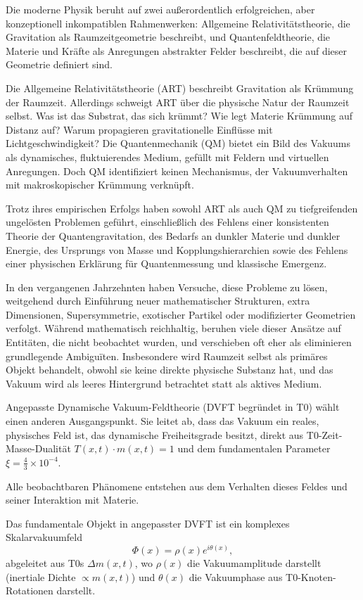 	Die moderne Physik beruht auf zwei außerordentlich erfolgreichen, aber konzeptionell inkompatiblen Rahmenwerken:
	Allgemeine Relativitätstheorie, die Gravitation als Raumzeitgeometrie beschreibt, und Quantenfeldtheorie, die Materie und Kräfte als Anregungen abstrakter Felder beschreibt, die auf dieser Geometrie definiert sind.
	
	Die Allgemeine Relativitätstheorie (ART) beschreibt Gravitation als Krümmung der Raumzeit.
	Allerdings schweigt ART über die physische Natur der Raumzeit selbst.
	Was ist das Substrat, das sich krümmt?
	Wie legt Materie Krümmung auf Distanz auf?
	Warum propagieren gravitationelle Einflüsse mit Lichtgeschwindigkeit?
	Die Quantenmechanik (QM)
	bietet ein Bild des Vakuums als dynamisches, fluktuierendes Medium, gefüllt mit Feldern und virtuellen Anregungen.
	Doch QM identifiziert keinen Mechanismus, der Vakuumverhalten mit makroskopischer Krümmung verknüpft.
	
	Trotz ihres empirischen Erfolgs haben sowohl ART als auch QM zu tiefgreifenden ungelösten Problemen geführt, einschließlich
	des Fehlens einer konsistenten Theorie der Quantengravitation, des Bedarfs an dunkler Materie und dunkler Energie, des Ursprungs
	von Masse und Kopplungshierarchien sowie des Fehlens einer physischen Erklärung für Quantenmessung und
	klassische Emergenz.
	
	In den vergangenen Jahrzehnten haben Versuche, diese Probleme zu lösen, weitgehend durch Einführung neuer mathematischer Strukturen, extra Dimensionen, Supersymmetrie, exotischer Partikel oder modifizierter Geometrien verfolgt.
	Während mathematisch reichhaltig, beruhen viele dieser Ansätze auf Entitäten, die nicht beobachtet wurden, und verschieben oft eher als eliminieren grundlegende Ambiguïten.
	Insbesondere wird Raumzeit selbst als primäres Objekt behandelt, obwohl sie keine direkte physische Substanz hat, und das Vakuum wird als leeres Hintergrund betrachtet statt als aktives Medium.
	
	Angepasste Dynamische Vakuum-Feldtheorie (DVFT begründet in T0) wählt einen anderen Ausgangspunkt.
	Sie leitet ab, dass das Vakuum ein reales, physisches Feld ist, das dynamische Freiheitsgrade besitzt, direkt aus T0-Zeit-Masse-Dualität $T(x,t) \cdot m(x,t) = 1$ und dem fundamentalen Parameter $\xi = \frac{4}{3} \times 10^{-4}$.
	
	Alle beobachtbaren Phänomene entstehen aus dem Verhalten dieses Feldes und seiner Interaktion mit Materie.
	
	Das fundamentale Objekt in angepasster DVFT ist ein komplexes Skalarvakuumfeld
	\[
	\Phi(x)=\rho(x)e^{i\theta(x)},
	\]
	abgeleitet aus T0s $\Delta m(x,t)$, wo $\rho(x)$ die Vakuumamplitude darstellt (inertiale Dichte $\propto m(x,t)$) und $\theta(x)$
	die Vakuumphase aus T0-Knoten-Rotationen darstellt.
	
